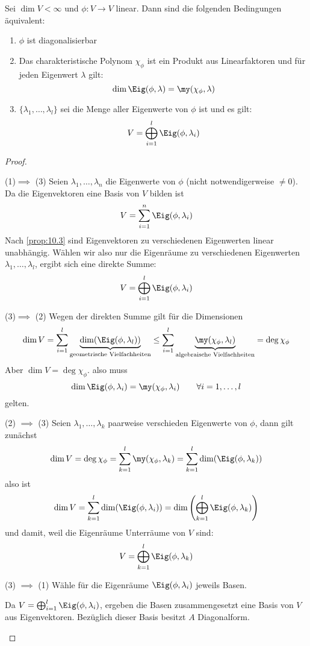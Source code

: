 \documentclass{mycourse}
\begin{document}
\begin{thm}
\label{11.3}
Sei $\dim V <\infty$ und $\phi:V \to V$ linear.
Dann sind die folgenden Bedingungen äquivalent:
\begin{enumerate}
\item $\phi$ ist diagonalisierbar
\item Das charakteristische Polynom $\chi_\phi$ ist ein Produkt aus Linearfaktoren und für jeden Eigenwert $\lambda$ gilt:
\[
\dim \Eig (\phi, \lambda) = \my(\chi_\phi,\lambda)
\]
\item $\{\lambda_1,\dotsc, \lambda_l\}$ sei die Menge aller Eigenwerte von $\phi$ ist und es gilt:
\[
V=\bigoplus_{i=1}^l \Eig(\phi, \lambda_i)
\]
\end{enumerate}

\begin{proof}
	\begin{seg}{(1)$\implies$ (3)}
Seien $\lambda_1,\dotsc, \lambda_n$ die Eigenwerte von $\phi$ (nicht notwendigerweise $\neq 0$).
Da die Eigenvektoren eine Basis von $V$ bilden ist
\[
	V = \sum_{i=1}^n \Eig(\phi,\lambda_i)
\]
Nach \ref{prop:10.3} sind Eigenvektoren zu verschiedenen Eigenwerten linear unabhängig.
Wählen wir also nur die Eigenräume zu verschiedenen Eigenwerten $\lambda_1,\dotsc,\lambda_l$, ergibt sich eine direkte Summe:
\[
V = \bigoplus_{i=1}^l \Eig(\phi,\lambda_i)
\]
\end{seg}
\begin{seg}{(3)$\implies$ (2)}
Wegen der direkten Summe gilt für die Dimensionen
\[
	\dim V = \sum_{i=1}^l\limits \underbrace{\dim ( \Eig(\phi, \lambda_l) )}_\text{geometrische Vielfachheiten} \le \sum_{i=1}^l \underbrace{\my(\chi_\phi, \lambda_l)}_{\text{algebraische Vielfachheiten}} = \deg \chi_\phi
\]
Aber $\dim V = \deg \chi_\phi$. also muss
\[
\dim  \Eig(\phi, \lambda_i) =\my(\chi_\phi, \lambda_i) \qquad \forall i=1,\dotsc,l
\]
gelten.
\end{seg}
\begin{seg}{(2) $\implies$ (3)}
Seien $\lambda_1,\dotsc,\lambda_k$ paarweise verschieden Eigenwerte von $\phi$, dann gilt zunächst
\[
	\dim V = \deg \chi_\phi = \sum_{k=1}^l \my(\chi_\phi,\lambda_k) = \sum_{k=1}^l \dim ( \Eig(\phi,\lambda_k) )
\]
also ist
\[
\dim V =\sum_{k=1}^l \dim (\Eig(\phi,\lambda_i)) = \dim\left (\bigoplus_{k=1}^l \Eig(\phi, \lambda_k)\right )
\]
und damit, weil die Eigenräume Unterräume von $V$ sind:
\[
V=\bigoplus_{k=1}^l \Eig(\phi,\lambda_k)
\]
\end{seg}
\begin{seg}{(3) $\implies$ (1)}
Wähle für die Eigenräume $\Eig(\phi,\lambda_i)$ jeweils Basen.

Da $V = \bigoplus_{i=1}^l \Eig(\phi,\lambda_i)$, ergeben die Basen zusammengesetzt eine Basis von $V$ aus Eigenvektoren.
Bezüglich dieser Basis besitzt $A$ Diagonalform.
\end{seg}
\end{proof}
\end{thm}
\end{document}
